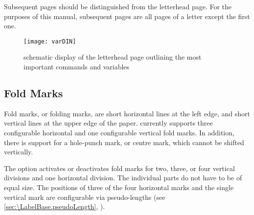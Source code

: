 Subsequent pages should be
distinguished from the letterhead page. For the purposes of this manual,
subsequent pages are all pages of a letter except the first one.

\begin{figure}
  \centering
  \texttt{[image: varDIN]}
  \caption{schematic display of the letterhead page outlining the most
    important commands and variables}
  \label{fig:\LabelBase.variables}
\end{figure}


\subsection{Fold Marks}
\BeginIndexGroup
{}%

Fold marks, or folding marks, are short horizontal lines at the left edge, and
short vertical lines at the upper edge of the paper. \KOMAScript{} currently
supports three configurable horizontal and one configurable vertical fold
marks. In addition, there is support for a hole-punch mark, or centre mark,
which cannot be shifted vertically.

\begin{Declaration}
\end{Declaration}
The  option activates or deactivates fold marks for two,
three, or four vertical divisions and one horizontal division. The individual
parts do not have to be of equal size. The positions of three of the four
horizontal marks and the single vertical mark are configurable via
pseudo-lengths (see \autoref{sec:\LabelBase.pseudoLength},
).

